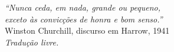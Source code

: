 \begin{epigrafe}
    \vspace*{\fill}
	\begin{flushright}
		\textit{``Nunca ceda, em nada, grande ou pequeno,\\
		       exceto às convicções de honra e bom senso.''}\\[0.5em]
		Winston Churchill, discurso em Harrow, 1941\\
		\textit{Tradução livre.}
	\end{flushright}
\end{epigrafe}
